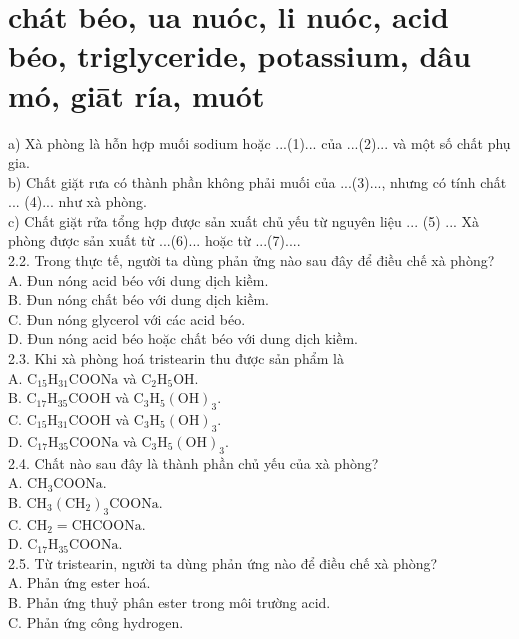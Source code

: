 \documentclass[10pt]{article}
\begin{document}
\section*{chát béo, ua nuóc, li nuóc, acid béo, triglyceride, potassium, dâu mó, giāt ría, muót}
a) Xà phòng là hỗn hợp muối sodium hoặc ...(1)... của ...(2)... và một số chất phụ gia.\\
b) Chất giặt rưa có thành phần không phải muối của ...(3)..., nhưng có tính chất ... (4)... như xà phòng.\\
c) Chất giặt rửa tổng hợp được sản xuất chủ yếu từ nguyên liệu ... (5) ... Xà phòng được sản xuất từ ...(6)... hoặc từ ...(7)....\\
2.2. Trong thực tế, người ta dùng phản ửng nào sau đây để điều chế xà phòng?\\
A. Đun nóng acid béo với dung dịch kiềm.\\
B. Đun nóng chất béo với dung dịch kiềm.\\
C. Đun nóng glycerol với các acid béo.\\
D. Đun nóng acid béo hoặc chất béo với dung dịch kiềm.\\
2.3. Khi xà phòng hoá tristearin thu được sản phẩm là\\
A. $\mathrm{C}_{15} \mathrm{H}_{31} \mathrm{COONa}$ và $\mathrm{C}_{2} \mathrm{H}_{5} \mathrm{OH}$.\\
B. $\mathrm{C}_{17} \mathrm{H}_{35} \mathrm{COOH}$ và $\mathrm{C}_{3} \mathrm{H}_{5}(\mathrm{OH})_{3}$.\\
C. $\mathrm{C}_{15} \mathrm{H}_{31} \mathrm{COOH}$ và $\mathrm{C}_{3} \mathrm{H}_{5}(\mathrm{OH})_{3}$.\\
D. $\mathrm{C}_{17} \mathrm{H}_{35} \mathrm{COONa}$ và $\mathrm{C}_{3} \mathrm{H}_{5}(\mathrm{OH})_{3}$.\\
2.4. Chất nào sau đây là thành phần chủ yếu của xà phòng?\\
A. $\mathrm{CH}_{3} \mathrm{COONa}$.\\
B. $\mathrm{CH}_{3}\left(\mathrm{CH}_{2}\right)_{3} \mathrm{COONa}$.\\
C. $\mathrm{CH}_{2}=\mathrm{CHCOONa}$.\\
D. $\mathrm{C}_{17} \mathrm{H}_{35} \mathrm{COONa}$.\\
2.5. Từ tristearin, người ta dùng phản ứng nào để điều chế xà phòng?\\
A. Phản ứng ester hoá.\\
B. Phản ứng thuỷ phân ester trong môi trường acid.\\
C. Phản ứng công hydrogen.\\
\end{document}
